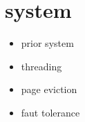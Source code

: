 \section{system}
\label{sec:system}

\begin{itemize}
    \item prior system \\
    \item threading \\
    \item page eviction \\
    \item faut tolerance
\end{itemize}

